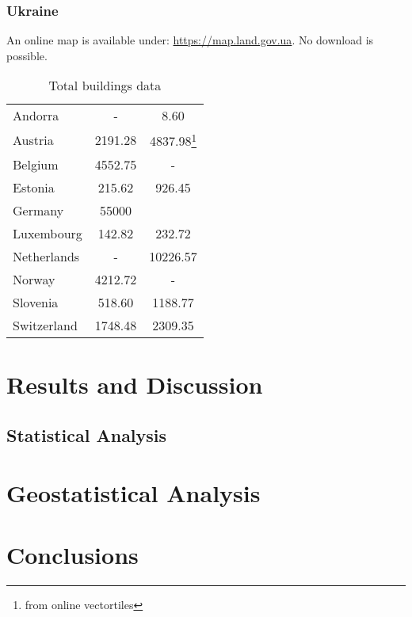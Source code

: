\documentclass[final, 3p, times, 12pt]{elsarticle} %
\begin{document}
\subsubsection{Ukraine}
An online map is available under: \url{https://map.land.gov.ua}. No download is possible.


\begin{table}
\caption[]{Total buildings data}
\begin{minipage}{\textwidth}
\small
\begin{center}
\begin{tabular}{ |l|S[table-format=5.2]|S[table-format=5.2]|}
 \hline
  & {} & {}\\
 \hline
 Andorra & {-} & 8.60\\
 Austria & 2191.28 & 4837.98\footnote{from online vectortiles\label{fn:vectortiles}}\\
 Belgium & 4552.75 & {-}\\
 Estonia & 215.62 & 926.45\\
 Germany &  55000 & \\
 Luxembourg & 142.82 & 232.72\\
 Netherlands & {-} & 10226.57\\
 Norway & 4212.72 & {-}\\
 Slovenia & 518.60 & 1188.77\\
 Switzerland & 1748.48 & 2309.35\\
 \hline
\end{tabular}
\end{center}

\end{minipage}
\end{table}

\section{Results and Discussion}\label{sec:results}
\subsection{Statistical Analysis}
\section{Geostatistical Analysis}
\section{Conclusions}\label{sec:conclusions}
\end{document}
